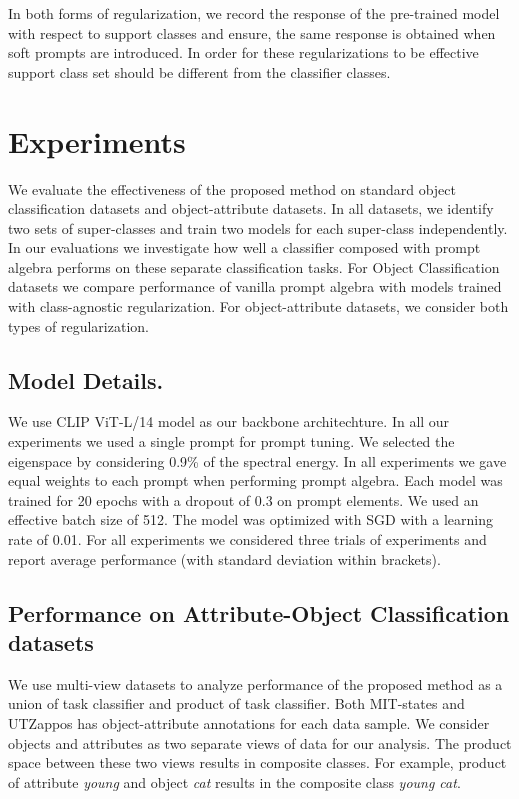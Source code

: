 \documentclass[10pt,twocolumn,letterpaper]{article}
\begin{document}
In both forms of regularization, we record the response of the pre-trained model with respect to support classes and ensure, the same response is obtained when soft prompts are introduced. In order for these regularizations to be effective support class set should be different from the classifier classes. 


\section{Experiments} \label{sec:results}

We evaluate the effectiveness of the proposed method on standard object classification datasets and object-attribute datasets. In all datasets, we identify two sets of super-classes and train two models for each super-class independently. In our evaluations we investigate how well a classifier composed with prompt algebra performs on these separate classification tasks. For Object Classification datasets we compare performance of vanilla prompt algebra with models trained with class-agnostic regularization. For object-attribute datasets, we consider both types of regularization.\\

\subsection{Model Details.} We use CLIP ViT-L/14 model as our backbone architechture. In all our experiments we used a single prompt for prompt tuning. We selected the eigenspace by considering 0.9\% of the spectral energy. In all experiments we gave equal weights to each prompt when performing prompt algebra. Each model was trained for 20 epochs with a dropout of 0.3 on prompt elements.  We used an effective batch size of 512. The model was optimized with SGD with a learning rate of 0.01. For all experiments we considered three trials of experiments and report average performance (with standard deviation within brackets).

\subsection{Performance on Attribute-Object Classification datasets}

We use multi-view datasets to analyze performance of the proposed method as a union of task classifier and product of task classifier. Both MIT-states\cite{mitstates} and UTZappos\cite{zappos} has object-attribute annotations for each data sample. We consider objects and attributes as two separate views of data for our analysis. The product space between these two views results in composite classes. For example, product of attribute \textit{young} and object \textit{cat} results in the composite class \textit{young cat}.
\end{document}
